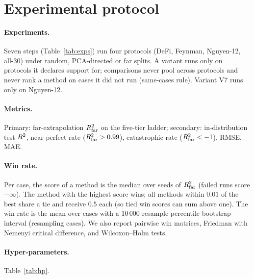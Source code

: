 \section{Experimental protocol}\label{sec:protocol}
\paragraph{Experiments.} Seven steps (Table~\ref{tab:exps}) run four protocols (DeFi, Feynman, Nguyen-12, all-30) under random, PCA-directed or far splits. A variant runs only on protocols it declares support for; comparisons never pool across protocols and never rank a method on cases it did not run (same-cases rule). Variant V7 runs only on Nguyen-12.
\begin{table}[t]\centering\small{}\caption{Experiment inventory (mirrors \texttt{run\_hybrid\_all.sh}).}\label{tab:exps}\end{table}
\paragraph{Metrics.} Primary: far-extrapolation $R^2_{\mathrm{far}}$ on the five-tier ladder; secondary: in-distribution test $R^2$, near-perfect rate ($R^2_{\mathrm{far}}>0.99$), catastrophic rate ($R^2_{\mathrm{far}}<-1$), RMSE, MAE.
\paragraph{Win rate.} Per case, the score of a method is the median over seeds of $R^2_{\mathrm{far}}$ (failed runs score $-\infty$). The method with the highest score wins; all methods within $0.01$ of the best share a tie and receive $0.5$ each (so tied win scores can sum above one). The win rate is the mean over cases with a 10\,000-resample percentile bootstrap interval (resampling cases). We also report pairwise win matrices, Friedman with Nemenyi critical difference, and Wilcoxon--Holm tests.
\paragraph{Hyper-parameters.} Table~\ref{tab:hp}.
\begin{table}[t]\centering\small{}\caption{Hyper-parameters and thresholds.}\label{tab:hp}\end{table}
